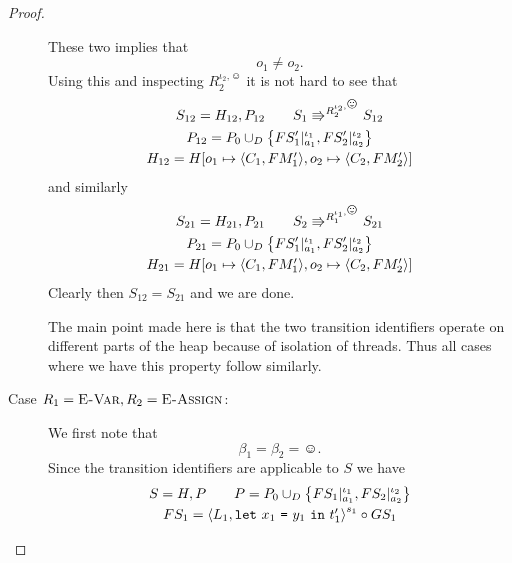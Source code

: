 \begin{proof}
\begin{description}
      These two implies that
      \begin{equation}
        o_1 \neq o_2.
      \end{equation}
      Using this and inspecting $R_2^{\iota_2, \smiley}$ it is not hard to see
      that 
      \begin{equation}
        \begin{gathered}
          S_{12} = H_{12}, P_{12} \andalso S_1 \Rrightarrow^{R_2^{\iota_2,
          \smiley}} S_{12}
          \\
          P_{12} = P_0 \cup_D \left\{ FS'_1|_{a_1}^{\iota_1},
          FS'_2|_{a_2}^{\iota_2} \right\} \\
          H_{12} = H[o_1 \mapsto \Obj{C_1, FM'_1}, o_2 \mapsto \Obj{C_2, FM'_2}]
        \end{gathered}
      \end{equation}
      and similarly 
      \begin{equation}
        \begin{gathered}
          S_{21} = H_{21}, P_{21} \andalso S_2 \Rrightarrow^{R_1^{\iota_1,
          \smiley}} S_{21}
          \\
          P_{21} = P_0 \cup_D \left\{ FS'_1|_{a_1}^{\iota_1},
          FS'_2|_{a_2}^{\iota_2} \right\} \\
          H_{21} = H[o_1 \mapsto \Obj{C_1, FM'_1}, o_2 \mapsto \Obj{C_2, FM'_2}]
        \end{gathered}
      \end{equation}
      Clearly then $S_{12} = S_{21}$ and we are done.
      \begin{remark}
        The main point made here is that the two transition identifiers operate
        on different parts of the heap because of isolation of threads. Thus all
        cases where we have this property follow similarly.
      \end{remark}
    \item[Case $R_1 = \mbox{{\sc E-Var}}, R_2 = \mbox{{\sc E-Assign}}$:] We first note that
      \begin{equation*}
        \beta_1 = \beta_2 = \smiley.
      \end{equation*}
      Since the transition identifiers are applicable to $S$ we have
      \begin{equation}
        \begin{gathered}
          S = H, P \andalso P = P_0 \cup_D \left\{ FS_1|_{a_1}^{\iota_1},
          FS_2|_{a_2}^{\iota_2} \right\} \\
          FS_1 = \xframe{L_1, \Let{x_1}{y_1}{t'_1}}^{s_1} \circ GS_1

\end{gathered}
\end{equation}
\end{description}
\end{proof}
